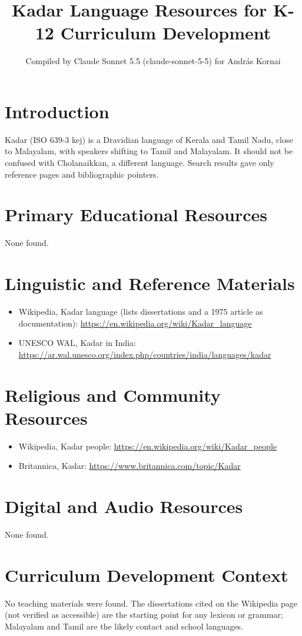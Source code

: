 \documentclass[12pt]{article}
\title{Kadar Language Resources for K-12 Curriculum Development}
\author{Compiled by Claude Sonnet 5.5 (claude-sonnet-5-5) for Andr\'as Kornai}
\date{}
\begin{document}
\maketitle
\section{Introduction}
Kadar (ISO 639-3 kej) is a Dravidian language of Kerala and Tamil Nadu, close to Malayalam, with speakers shifting to Tamil and Malayalam. It should not be confused with Cholanaikkan, a different language. Search results gave only reference pages and bibliographic pointers.
\section{Primary Educational Resources}
None found.
\section{Linguistic and Reference Materials}
\begin{itemize}
\item Wikipedia, Kadar language (lists dissertations and a 1975 article as documentation): \url{https://en.wikipedia.org/wiki/Kadar_language}
\item UNESCO WAL, Kadar in India: \url{https://ar.wal.unesco.org/index.php/countries/india/languages/kadar}
\end{itemize}
\section{Religious and Community Resources}
\begin{itemize}
\item Wikipedia, Kadar people: \url{https://en.wikipedia.org/wiki/Kadar_people}
\item Britannica, Kadar: \url{https://www.britannica.com/topic/Kadar}
\end{itemize}
\section{Digital and Audio Resources}
None found.
\section{Curriculum Development Context}
No teaching materials were found. The dissertations cited on the Wikipedia page (not verified as accessible) are the starting point for any lexicon or grammar; Malayalam and Tamil are the likely contact and school languages.
\end{document}
